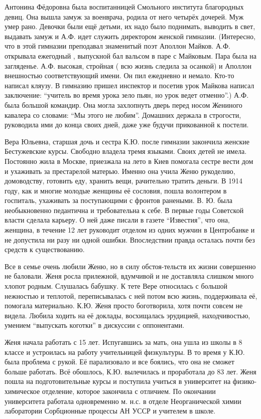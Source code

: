 Антонина Фёдоровна была воспитанницей Смольного
\linebreak
института благородных девиц.
Она вышла замуж за военврача, родила от него четырёх дочерей. Муж умер рано. Девочки были ещё детьми, их надо было поднимать, выводить в свет, выдавать замуж и А.Ф. идет служить директором женской гимназии. (Интересно, что в этой гимназии преподавал знаменитый поэт Аполлон Майков. А.Ф. открывала ежегодный , выпускной бал вальсом в паре с Майковым. Пара была на загляденье. А.Ф. высокая, стройная ( всю жизнь следила за осанкой) и Аполлон внешностью соответствующий имени. Он пил ежедневно и немало. Кто-то написал кляузу. В гимназию пришел инспектор и посетив урок Майкова написал заключение: “учитель во время урока зело пьян, но урок ведет отменно”.) А.Ф. была большой командир. Она могла захлопнуть дверь перед носом Жениного кавалера со словами: “Мы этого не любим”. Домашних держала в строгости, руководила ими до конца своих дней, даже уже будучи прикованной к постели.

Вера Юльевна, старшая дочь и сестра К.Ю. после гимназии закончила женские Бестужевские курсы. Свободно владела тремя языками. Своих детей не имела. Постоянно жила в Москве, приезжала на лето в Киев помогала сестре вести дом и ухаживать за престарелой матерью. Именно она учила Женю рукоделию, домоводству, готовить еду, хранить вещи, рачительно тратить деньги. В 1914 году, как и многие молодые женщины её сословия, пошла волонтером в госпиталь, ухаживать за поступающими с фронтов ранеными. В. Ю. была необыкновенно педантична и требовательна к себе. В первые годы Советской власти сделала карьеру. О ней даже писали в газете “Известия”, что она, женщина, в течение 12 лет руководит отделом из одних мужчин в Центробанке и не допустила ни разу ни одной ошибки. Впоследствии правда осталась почти без средств к существованию.

Все в семье очень любили Женю, но в силу
обстоя-\linebreak тельств
их жизни совершенно не баловали.
Женя росла прилежной, вдумчивой и не доставляла слишком много хлопот родным. Слушалась бабушку. К тете Вере относилась с большой нежностью и теплотой, переписывалась с ней потом всю жизнь, поддерживала её, помогала материально. К.Ю. Женя просто боготворила, хотя почти совсем не видела. Любила ходить на её доклады, восхищалась эрудицией, находчивостью, умением “выпускать коготки” в дискуссии с оппонентами.

Женя начала работать с 15 лет. Испугавшись за мать, она ушла из школы в 8 классе и устроилась на работу учительницей физкультуры. В то время у К.Ю. была проблема с рукой. Её парализовало и все боялись, что она не сможет больше работать. Всё обошлось, К.Ю. вылечилась и проработала до 83 лет. Женя пошла на подготовительные курсы и поступила учиться в университет на физико-химическое отделение, которое закончила с отличием. По окончании университета работала одновременно м. н.с. в отделе Неорганической химии лаборатории Сорбционные процессы АН УССР и учителем в школе.

